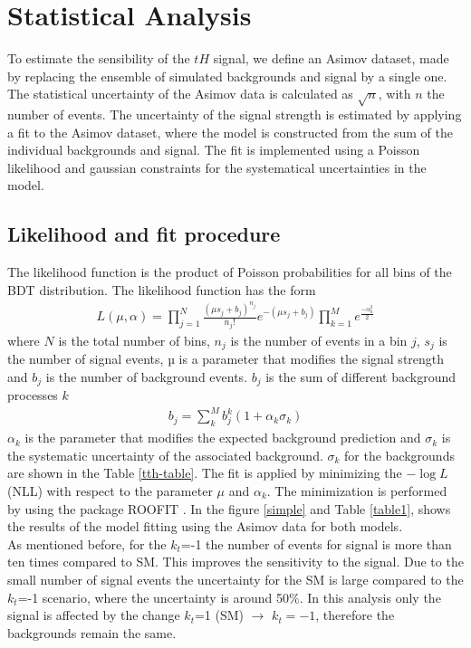 \chapter{Statistical Analysis}
	To estimate the sensibility of the $tH$ signal, we define an Asimov dataset, made by replacing the ensemble of simulated backgrounds and signal by a single one. The statistical uncertainty of the Asimov data is calculated as $\sqrt{n}$, with $n$ the number of events. The uncertainty of the signal strength is estimated by applying a fit to the Asimov dataset, where the model
	is constructed from the sum of the individual backgrounds and signal. The fit is implemented using a Poisson likelihood and gaussian constraints for the systematical uncertainties in the model.
	
	
	\section{Likelihood and fit procedure}
	The likelihood function is the product of Poisson probabilities for all bins of the BDT distribution. The likelihood function has the form
	\begin{align}
		L(\mu,\alpha)=\prod_{j=1}^{N}\frac{(\mu s_j +b_j)^{n_j}}{n_j !}e^{-(\mu s_j+b_j)} \prod_{k=1}^M e^{\frac{-\alpha^2_k}{2}}
	\end{align}
	where $N$ is the total number of bins, $n_j$ is the number of events in a bin $j$, $s_j$ is the number of signal events, µ is a parameter that modifies the signal strength and $b_j$ is the number of background events.
	$b_j$ is the sum of different background processes $k$
	\begin{align}
		b_j=\sum_k^M b_j^k(1+ \alpha_k \sigma_k)
	\end{align}
	$\alpha_k$ is the parameter that modifies the expected background prediction and $\sigma_k$ is the systematic uncertainty of the associated background. $\sigma_k$ for the backgrounds are shown in the Table \ref{tth-table}.
	The fit is applied by minimizing the $-\log{L}$ (NLL) with respect to the parameter $\mu$ and $\alpha_k$. The minimization is performed by using the package ROOFIT \cite{roofit}. In the figure \ref{simple} and Table \ref{table1}, shows the results of the model fitting using the Asimov data for both models. \\
	As mentioned before, for the $k_t$=-1 the number of events for signal is more than ten times compared to SM. This improves the sensitivity to the signal. Due to the small number of signal events the uncertainty for the SM is large compared to the $k_t$=-1 scenario, where the uncertainty is around 50$\%$. In this analysis only the signal is affected by the change $k_t$=1 (SM) $\rightarrow$ $k_t=-1$, therefore the backgrounds remain the same.
	
